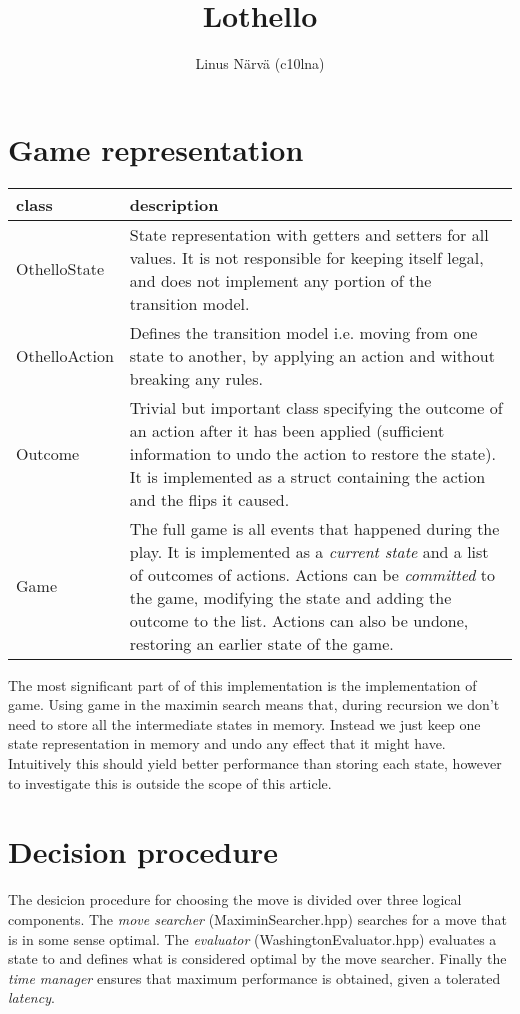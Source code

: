 \documentclass[a4paper,11pt]{article}
\title{Lothello}
\author{Linus Närvä (c10lna)}
\begin{document}
\maketitle

\section{Game representation}
\begin{tabular}{|l|p{12 cm}|}
\hline
\textbf{class} & \textbf{description}
\\ \hline
OthelloState & State representation with getters and setters for all values. It is not responsible for keeping itself legal, and does not implement any portion of the transition model.
\\ \hline
OthelloAction & Defines the transition model i.e. moving from one state to another, by applying an action and without breaking any rules.
\\ \hline
Outcome & Trivial but important class specifying the outcome of an action after it has been applied (sufficient information to undo the action to restore the state). It is implemented as a struct containing the action and the flips it caused.
\\ \hline
Game & The full game is all events that happened during the play. It is implemented as a \textit{current state} and a list of outcomes of actions. Actions can be \textit{committed} to the game, modifying the state and adding the outcome to the list. Actions can also be undone, restoring an earlier state of the game.
\\ \hline
\end{tabular}
The most significant part of of this implementation is the implementation of game. Using game in the maximin search means that, during recursion we don't need to store all the intermediate states in memory. Instead we just keep one state representation in memory and undo any effect that it might have. Intuitively this should yield better performance than storing each state, however to investigate this is outside the scope of this article.

\section{Decision procedure}
The desicion procedure for choosing the move is divided over three logical components. The \textit{move searcher} (MaximinSearcher.hpp) searches for a move that is in some sense optimal. The \textit{evaluator} (WashingtonEvaluator.hpp) evaluates a state to and defines what is considered optimal by the move searcher. Finally the \textit{time manager} ensures that maximum performance is obtained, given a tolerated \textit{latency}.
\end{document}
